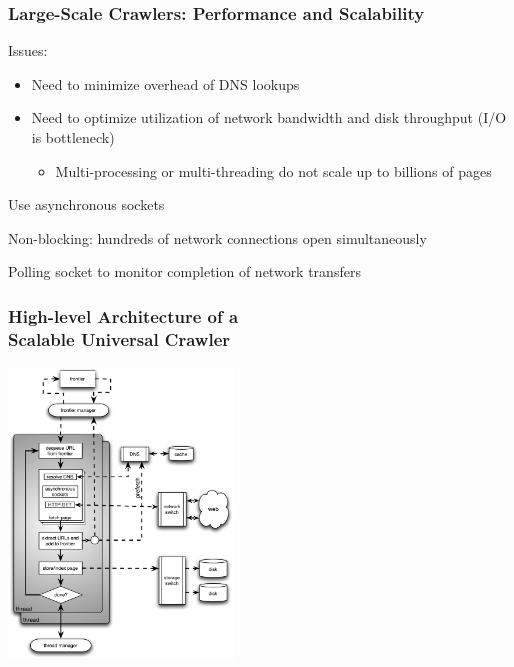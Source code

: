 \documentclass{beamer}
\begin{document}
\begin{frame} \frametitle{Large-Scale Crawlers: Performance and Scalability}

\begin{block}{Issues:}
\begin{itemize}
  \item Need to minimize overhead of DNS lookups
  \item Need to optimize utilization of network bandwidth and disk
    throughput (I/O is bottleneck) 
    \begin{itemize}
        \item Multi-processing or multi-threading do not scale up to billions of pages
    \end{itemize}
\end{itemize}
\end{block}

\begin{block}{Use asynchronous sockets}


Non-blocking: hundreds of network connections open simultaneously

Polling socket to monitor completion of network transfers
\end{block}

\end{frame}

\begin{frame} \frametitle{High-level Architecture of a \\ Scalable Universal Crawler}

    \centering
    \includegraphics[width=6cm]{scalable-crawler-arch}

\end{frame}
\end{document}
